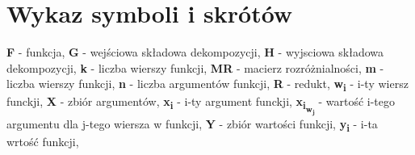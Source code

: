\chapter*{Wykaz symboli i skrótów}

\noindent
\textbf{F} - funkcja, \newline
\textbf{G} - wejściowa składowa dekompozycji, \newline
\textbf{H} - wyjsciowa składowa dekompozycji, \newline
\textbf{k} - liczba wierszy funkcji, \newline
\textbf{MR} - macierz rozróżnialności, \newline
\textbf{m} - liczba wierszy funkcji, \newline
\textbf{n} - liczba argumentów funkcji, \newline
\textbf{R} - redukt, \newline
\textbf{\texorpdfstring{w\textsubscript{i}}{w i}} - i-ty wiersz funckji, \newline
\textbf{X} - zbiór argumentów, \newline
\textbf{\texorpdfstring{x\textsubscript{i}}{x i}} - i-ty argument funckji, \newline
\textbf{\texorpdfstring{x\textsubscript{i\textsubscript{w\textsubscript{j}}}}{x i w j}} - wartość i-tego argumentu dla j-tego wiersza w funkcji, \newline
\textbf{Y} - zbiór wartości funkcji, \newline
\textbf{\texorpdfstring{y\textsubscript{i}}{y i}} - i-ta wrtość funkcji, \newline

\cleardoublepage